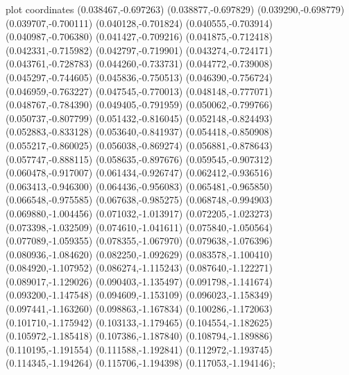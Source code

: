 { plot coordinates {(0.038467,-0.697263) (0.038877,-0.697829) (0.039290,-0.698779) (0.039707,-0.700111) (0.040128,-0.701824) (0.040555,-0.703914) (0.040987,-0.706380) (0.041427,-0.709216) (0.041875,-0.712418) (0.042331,-0.715982) (0.042797,-0.719901) (0.043274,-0.724171) (0.043761,-0.728783) (0.044260,-0.733731) (0.044772,-0.739008) (0.045297,-0.744605) (0.045836,-0.750513) (0.046390,-0.756724) (0.046959,-0.763227) (0.047545,-0.770013) (0.048148,-0.777071) (0.048767,-0.784390) (0.049405,-0.791959) (0.050062,-0.799766) (0.050737,-0.807799) (0.051432,-0.816045) (0.052148,-0.824493) (0.052883,-0.833128) (0.053640,-0.841937) (0.054418,-0.850908) (0.055217,-0.860025) (0.056038,-0.869274) (0.056881,-0.878643) (0.057747,-0.888115) (0.058635,-0.897676) (0.059545,-0.907312) (0.060478,-0.917007) (0.061434,-0.926747) (0.062412,-0.936516) (0.063413,-0.946300) (0.064436,-0.956083) (0.065481,-0.965850) (0.066548,-0.975585) (0.067638,-0.985275) (0.068748,-0.994903) (0.069880,-1.004456) (0.071032,-1.013917) (0.072205,-1.023273) (0.073398,-1.032509) (0.074610,-1.041611) (0.075840,-1.050564) (0.077089,-1.059355) (0.078355,-1.067970) (0.079638,-1.076396) (0.080936,-1.084620) (0.082250,-1.092629) (0.083578,-1.100410) (0.084920,-1.107952) (0.086274,-1.115243) (0.087640,-1.122271) (0.089017,-1.129026) (0.090403,-1.135497) (0.091798,-1.141674) (0.093200,-1.147548) (0.094609,-1.153109) (0.096023,-1.158349) (0.097441,-1.163260) (0.098863,-1.167834) (0.100286,-1.172063) (0.101710,-1.175942) (0.103133,-1.179465) (0.104554,-1.182625) (0.105972,-1.185418) (0.107386,-1.187840) (0.108794,-1.189886) (0.110195,-1.191554) (0.111588,-1.192841) (0.112972,-1.193745) (0.114345,-1.194264) (0.115706,-1.194398) (0.117053,-1.194146)};
}
